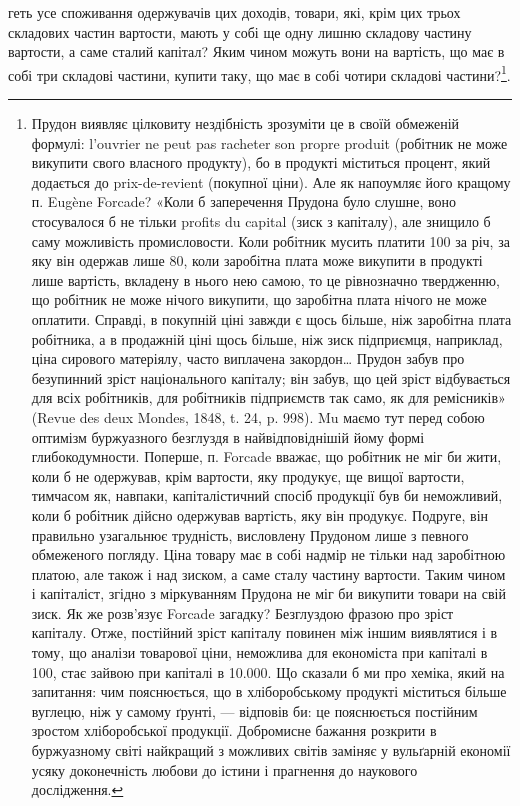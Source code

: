 \parcont{}  %
геть усе споживання одержувачів цих доходів, товари, які, крім цих трьох складових
частин вартости, мають у собі ще одну лишню складову частину вартости,
а саме сталий капітал? Яким чином можуть вони на вартість, що має в
собі три складові частини, купити таку, що має в собі чотири складові частини?\footnote{
Прудон виявляє цілковиту нездібність зрозуміти це в своїй обмеженій формулі: l’ouvrier ne peut
pas racheter son propre produit (робітник не може викупити свого власного продукту), бо в продукті
міститься процент, який додається до prix-de-revient (покупної ціни). Але як напоумляє його кращому
п. Eugène Forcade? «Коли б заперечення Прудона було слушне, воно стосувалося б не тільки profits du
capital (зиск з капіталу), але знищило б саму можливість промисловости. Коли робітник мусить платити
100 за річ, за яку він одержав лише 80, коли заробітна плата може викупити в продукті лише вартість,
вкладену в нього нею самою, то це рівнозначно твердженню, що робітник не може нічого викупити, що
заробітна плата нічого не може оплатити. Справді, в покупній ціні завжди є щось більше, ніж
заробітна плата робітника, а в продажній ціні щось більше, ніж зиск підприємця, наприклад, ціна
сирового матеріялу, часто виплачена закордон\dots{} Прудон забув про безупинний зріст національного
капіталу; він забув, що цей зріст відбувається для всіх робітників, для робітників підприємств так
само, як для ремісників» (Revue des deux Mondes, 1848, t. 24, p. 998). Mu маємо тут перед собою
оптимізм буржуазного безглуздя в найвідповіднішій йому формі глибокодумности. Поперше, п. Forcade
вважає, що робітник не міг би жити, коли б не одержував, крім вартости, яку продукує, ще вищої
вартости, тимчасом як, навпаки, капіталістичний спосіб продукції був би неможливий, коли б робітник
дійсно
одержував вартість, яку він продукує. Подруге, він правильно узагальнює трудність, висловлену
Прудоном лише з певного обмеженого погляду. Ціна товару має в собі надмір не тільки над заробітною
платою, але також і над зиском, а саме сталу частину вартости. Таким чином і капіталіст, згідно з
міркуванням Прудона не міг би викупити товари на свій зиск. Як же розв’язує Forcade загадку?
Безглуздою фразою про зріст капіталу. Отже, постійний зріст капіталу повинен між іншим виявлятися і
в тому, що аналізи товарової ціни, неможлива для економіста при капіталі в 100, стає зайвою при
капіталі в \num{10.000}. Що сказали б ми про хеміка, який на запитання: чим пояснюється, що в
хліборобському продукті міститься більше вуглецю, ніж у самому ґрунті, — відповів би: це пояснюється
постійним зростом хліборобської продукції. Добромисне бажання розкрити в буржуазному світі найкращий
з можливих світів заміняє у вульґарній економії усяку доконечність любови до істини і прагнення до
наукового дослідження.
}.

